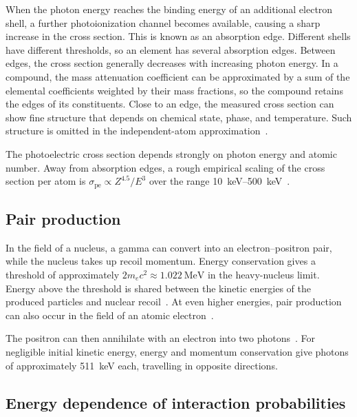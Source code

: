 When the photon energy reaches the binding energy of an additional electron shell, a further photoionization channel becomes available, causing a sharp increase in the cross section. This is known as an absorption edge. Different shells have different thresholds, so an element has several absorption edges. Between edges, the cross section generally decreases with increasing photon energy. In a compound, the mass attenuation coefficient can be approximated by a sum of the elemental coefficients weighted by their mass fractions, so the compound retains the edges of its constituents. Close to an edge, the measured cross section can show fine structure that depends on chemical state, phase, and temperature. Such structure is omitted in the independent-atom approximation~\parencite[section 2]{hubbell1995attenuation}.

The photoelectric cross section depends strongly on photon energy and atomic number. Away from absorption edges, a rough empirical scaling of the cross section per atom is $\sigma_{\mathrm{pe}} \propto Z^{4.5}/E^3$ over the range \qtyrange{10}{500}{\kilo\electronvolt}~\parencite[table 2-5 and accompanying text]{hubbell1969photon}.

\subsection{Pair production}

In the field of a nucleus, a gamma can convert into an electron--positron pair, while the nucleus takes up recoil momentum. Energy conservation gives a threshold of approximately $2m_ec^2\approx\qty{1.022}{\mega\electronvolt}$ in the heavy-nucleus limit. Energy above the threshold is shared between the kinetic energies of the produced particles and nuclear recoil~\parencite{betheheitler1934pairs}. At even higher energies, pair production can also occur in the field of an atomic electron~\parencite{wheeler1936triples}.

The positron can then annihilate with an electron into two photons~\parencite[p.~347]{klemperer1934annihilation}. For negligible initial kinetic energy, energy and momentum conservation give photons of approximately \qty{511}{\kilo\electronvolt} each, travelling in opposite directions.

\subsection{Energy dependence of interaction probabilities}

